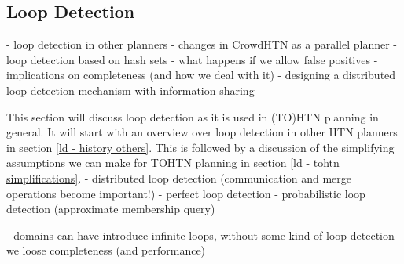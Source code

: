 \subsection{Loop Detection}
\label{improv: loop detection}

- loop detection in other planners
- changes in CrowdHTN as a parallel planner
- loop detection based on hash sets
- what happens if we allow false positives
	- implications on completeness (and how we deal with it)
	- designing a distributed loop detection mechanism with information sharing

This section will discuss loop detection as it is used in (TO)HTN planning in general. It will start with an overview over loop detection in other HTN planners in section \ref{ld - history others}. This is followed by a discussion of the simplifying assumptions we can make for TOHTN planning in section \ref{ld - tohtn simplifications}.
- distributed loop detection (communication and merge operations become important!)
- perfect loop detection
- probabilistic loop detection (approximate membership query)

- \cite{magnaguagno2020hypertension} domains can have introduce infinite loops, without some kind of loop detection we loose completeness (and performance)



